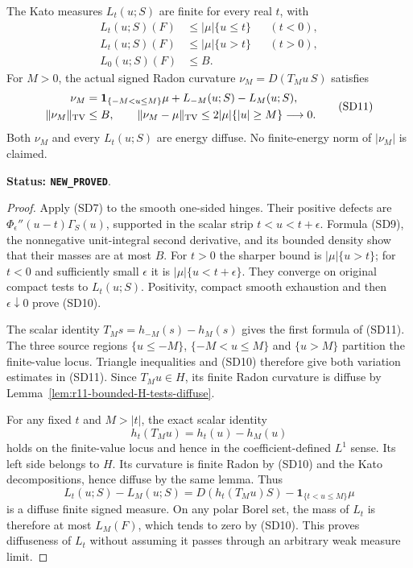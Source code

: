 \begin{proposition}
\label{prop:r11-signed-global-curvature-truncation}
The Kato measures $L_t(u;S)$ are finite for every real $t$,
with
\[
 \begin{aligned}
 L_t(u;S)(F)&\le |\mu|\{u\le t\}&& (t<0),\\
 L_t(u;S)(F)&\le |\mu|\{u>t\}&& (t>0),\\
 L_0(u;S)(F)&\le B.
 \end{aligned}
 \tag{SD10}
\]
For $M>0$, the actual signed Radon curvature
$\nu_M=D(T_Mu\,S)$ satisfies
\[
 \begin{split}
 \nu_M&=\mathbf1_{\{-M<u\le M\}}\mu+L_{-M}(u;S)-L_M(u;S),\\
 \|\nu_M\|_{\rm TV}&\le B,\qquad
 \|\nu_M-\mu\|_{\rm TV}
                    \le2|\mu|\{|u|\ge M\}\longrightarrow0.
 \end{split}
 \tag{SD11}
\]
Both $\nu_M$ and every $L_t(u;S)$ are energy diffuse.
No finite-energy norm of $|\nu_M|$ is claimed.
\end{proposition}

\noindent\textbf{Status: \texttt{NEW\_PROVED}}.

\begin{proof}
Apply (SD7) to the smooth one-sided hinges.  Their positive
defects are
$\Phi_\epsilon''(u-t)\Gamma_S(u)$, supported in the scalar
strip $t<u<t+\epsilon$.  Formula (SD9), the nonnegative
unit-integral second derivative, and its bounded density
show that their masses are at most $B$.
For $t>0$ the sharper bound is $|\mu|\{u>t\}$; for
$t<0$ and sufficiently small $\epsilon$ it is
$|\mu|\{u<t+\epsilon\}$.
They converge on original compact tests to $L_t(u;S)$.
Positivity, compact smooth exhaustion and then
$\epsilon\downarrow0$ prove (SD10).

The scalar identity $T_Ms=h_{-M}(s)-h_M(s)$ gives the
first formula of (SD11).  The three source regions
$\{u\le-M\}$, $\{-M<u\le M\}$ and $\{u>M\}$
partition the finite-value locus.  Triangle inequalities
and (SD10) therefore give both variation estimates in
(SD11).  Since $T_Mu\in H$, its finite Radon curvature
is diffuse by Lemma~\ref{lem:r11-bounded-H-tests-diffuse}.

For any fixed $t$ and $M>|t|$, the exact scalar identity
\[
                    h_t(T_Mu)=h_t(u)-h_M(u)
 \tag{SD12}
\]
holds on the finite-value locus and hence in the coefficient-defined
$L^1$ sense.  Its left side belongs to $H$.  Its curvature is finite Radon
by (SD10) and the Kato decompositions, hence diffuse by
the same lemma.  Thus
\[
 L_t(u;S)-L_M(u;S)
       =D(h_t(T_Mu)S)-\mathbf1_{\{t<u\le M\}}\mu
\]
is a diffuse finite signed measure.  On any polar Borel
set, the mass of $L_t$ is therefore at most $L_M(F)$,
which tends to zero by (SD10).  This proves diffuseness
of $L_t$ without assuming it passes through an arbitrary
weak measure limit.
\end{proof}

